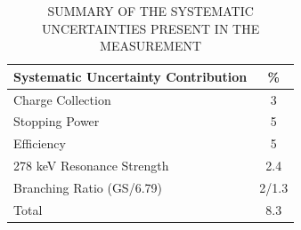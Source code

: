 \begin{table}[]
\caption{SUMMARY OF THE SYSTEMATIC UNCERTAINTIES PRESENT IN THE MEASUREMENT}
\begin{center}
\begin{threeparttable}
\begin{tabular}{lc}
Systematic Uncertainty Contribution & \% \\ 
\hline
Charge Collection & 3 \\
Stopping Power & 5 \\
Efficiency & 5 \\
278 keV Resonance Strength & 2.4 \\
Branching Ratio (GS/6.79) & 2/1.3 \\
\hline
Total & 8.3\\
\end{tabular}
\end{threeparttable}
\label{table: systematic_uncertainties}
\end{center}
\end{table}  



